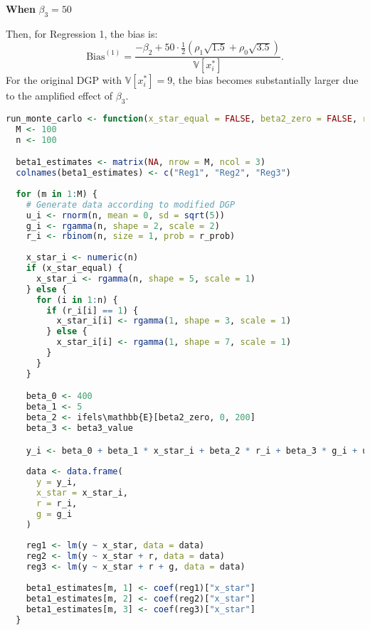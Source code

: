 \documentclass[a4paper,12pt]{article} %
\theoremstyle{nonitalic}
\newenvironment{solution}[1]
  {\renewcommand\theinnercustomsol{#1}\innercustomsol}
  {\endinnercustomsol}
\newcounter{solutionctr}
\renewcommand{\thesolutionctr}{(\alph{solutionctr})}
\newenvironment{autosolution}
  {\stepcounter{solutionctr}\begin{solution}{\thesolutionctr}}
  {\end{solution}}
\begin{document}
\begin{autosolution}
\textbf{When} $\beta_3 = 50$

Then, for Regression 1, the bias is:
\[
\text{Bias}^{(1)}=\frac{-\beta_2+50\cdot \frac{1}{2}\left(\rho_1\sqrt{1.5}+\rho_0\sqrt{3.5}\right)}{\mathbb{V}[x_i^*]}.
\]
For the original DGP with $\mathbb{V}[x_i^*]=9$, 
the bias becomes substantially larger due to the amplified effect of $\beta_3$.



\begin{lstlisting}[language=R]
run_monte_carlo <- function(x_star_equal = FALSE, beta2_zero = FALSE, r_prob = 0.5, beta3_value = 10) {
  M <- 100
  n <- 100

  beta1_estimates <- matrix(NA, nrow = M, ncol = 3)
  colnames(beta1_estimates) <- c("Reg1", "Reg2", "Reg3")
    
  for (m in 1:M) {
    # Generate data according to modified DGP
    u_i <- rnorm(n, mean = 0, sd = sqrt(5))
    g_i <- rgamma(n, shape = 2, scale = 2)
    r_i <- rbinom(n, size = 1, prob = r_prob)
    
    x_star_i <- numeric(n)
    if (x_star_equal) {
      x_star_i <- rgamma(n, shape = 5, scale = 1)
    } else {
      for (i in 1:n) {
        if (r_i[i] == 1) {
          x_star_i[i] <- rgamma(1, shape = 3, scale = 1)
        } else {
          x_star_i[i] <- rgamma(1, shape = 7, scale = 1)
        }
      }
    }

    beta_0 <- 400
    beta_1 <- 5
    beta_2 <- ifels\mathbb{E}[beta2_zero, 0, 200]
    beta_3 <- beta3_value

    y_i <- beta_0 + beta_1 * x_star_i + beta_2 * r_i + beta_3 * g_i + u_i
    
    data <- data.frame(
      y = y_i,
      x_star = x_star_i,
      r = r_i,
      g = g_i
    )
    
    reg1 <- lm(y ~ x_star, data = data)
    reg2 <- lm(y ~ x_star + r, data = data)
    reg3 <- lm(y ~ x_star + r + g, data = data)
    
    beta1_estimates[m, 1] <- coef(reg1)["x_star"]
    beta1_estimates[m, 2] <- coef(reg2)["x_star"]
    beta1_estimates[m, 3] <- coef(reg3)["x_star"]
  }
    

\end{lstlisting}
\end{autosolution}
\end{document}
